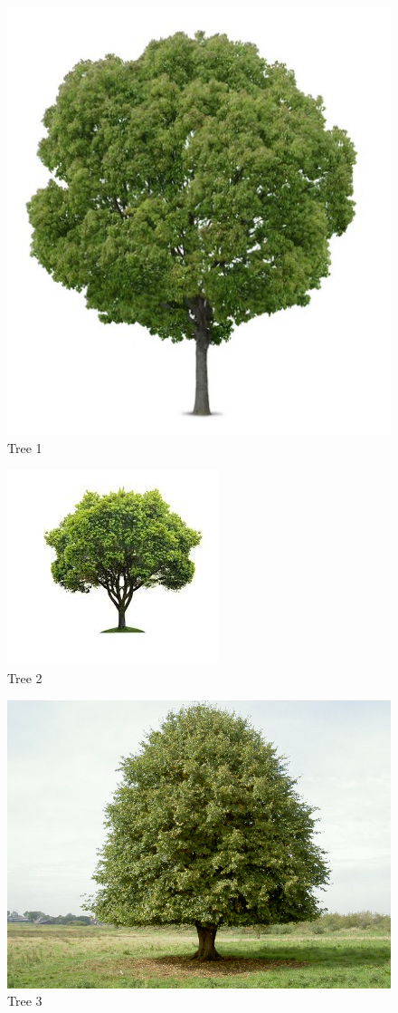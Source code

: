 \documentclass[12pt]{article}
\begin{document}
\begin{figure}[H]
\centering
\includegraphics[scale = 1.5]{img/boom1}
\caption{Tree 1}
\label{tree1}
\end{figure}

\begin{figure}[H]
\centering
\includegraphics[]{img/boom2}
\caption{Tree 2}
\label{tree2}
\end{figure}

\begin{figure}[H]
\centering
\includegraphics[scale = 0.5]{img/boom3}
\caption{Tree 3}
\label{tree3}
\end{figure}
\end{document}
